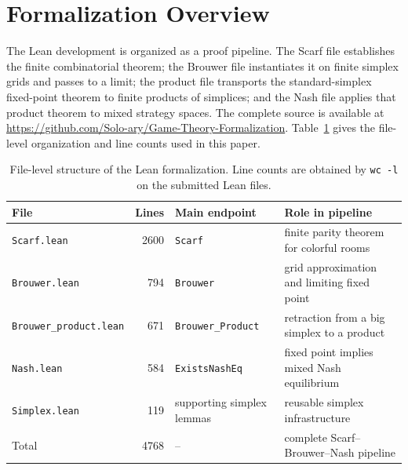 \documentclass{article}
\theoremstyle{definition}
\begin{document}



\onecolumn
\appendix

\section{Formalization Overview}
\label{app:formalization-overview}

The Lean development is organized as a proof pipeline. The Scarf file establishes the finite combinatorial theorem; the Brouwer file instantiates it on finite simplex grids and passes to a limit; the product file transports the standard-simplex fixed-point theorem to finite products of simplices; and the Nash file applies that product theorem to mixed strategy spaces. The complete source is available at \url{https://github.com/Solo-ary/Game-Theory-Formalization}. Table~\ref{tab:appendix-file-map} gives the file-level organization and line counts used in this paper.

\begin{table}[H]
\caption{File-level structure of the Lean formalization. Line counts are obtained by \texttt{wc -l} on the submitted Lean files.}
\label{tab:appendix-file-map}
\begin{center}
    \begin{small}
      \begin{tabular}{lrll}
\toprule
File & Lines & Main endpoint & Role in pipeline \\
\midrule
\texttt{Scarf.lean} & 2600 & \texttt{Scarf} & finite parity theorem for colorful rooms \\
\texttt{Brouwer.lean} & 794 & \texttt{Brouwer} & grid approximation and limiting fixed point \\
\texttt{Brouwer\_product.lean} & 671 & \texttt{Brouwer\_Product} & retraction from a big simplex to a product \\
\texttt{Nash.lean} & 584 & \texttt{ExistsNashEq} & fixed point implies mixed Nash equilibrium \\
\texttt{Simplex.lean} & 119 & supporting simplex lemmas & reusable simplex infrastructure \\
\midrule
Total & 4768 & -- & complete Scarf--Brouwer--Nash pipeline \\
\bottomrule
\end{tabular}
    \end{small}
  \end{center}
  \vskip -0.1in
\end{table}
\end{document}
